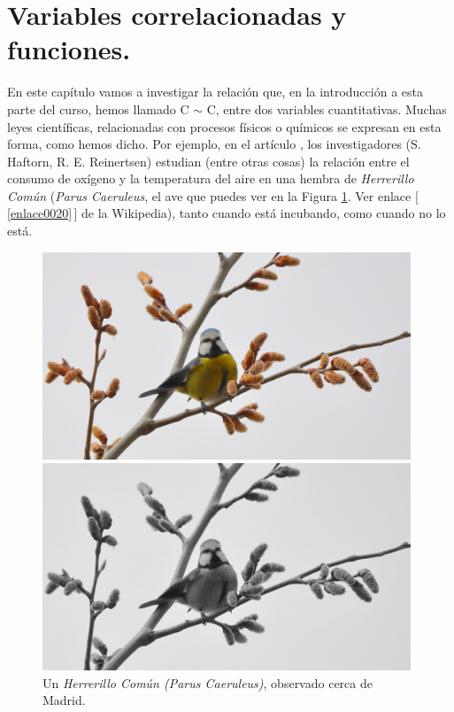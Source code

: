 
\section{Variables correlacionadas y funciones.}
\label{cap10:sec:VariablesCorrelacionadasFunciones}

En este capítulo vamos a investigar la relación que, en la introducción a esta parte del curso,
hemos llamado C $\sim$ C, entre dos variables cuantitativas. Muchas leyes científicas, relacionadas
con procesos físicos o químicos se expresan en esta forma, como hemos dicho. Por ejemplo, en el
artículo \cite{haftorn1985effect}, los investigadores (S. Haftorn, R. E. Reinertsen) estudian
(entre otras cosas) la relación entre el consumo de oxígeno y la temperatura del aire en una hembra de {\em Herrerillo Común} ({\em Parus Caeruleus}, el ave que puedes ver en la Figura
\ref{cap10:fig:Herrerillo}. Ver enlace [\,\ref{enlace0020}\,]\label{enlace0020a} de la Wikipedia), tanto cuando está incubando, como cuando no lo está.

\begin{figure}[htbp]
\begin{center}
\begin{enColor}
\includegraphics[width=11cm]{../fig/Cap10-Herrerillo.png}
\end{enColor}
\begin{bn}
\includegraphics[width=11cm]{../fig/Cap10-Herrerillo-bn.png}
\end{bn}
\caption{Un {\em Herrerillo Común (Parus Caeruleus)}, observado cerca de Madrid.}
\label{cap10:fig:Herrerillo}
\end{center}
\end{figure}

